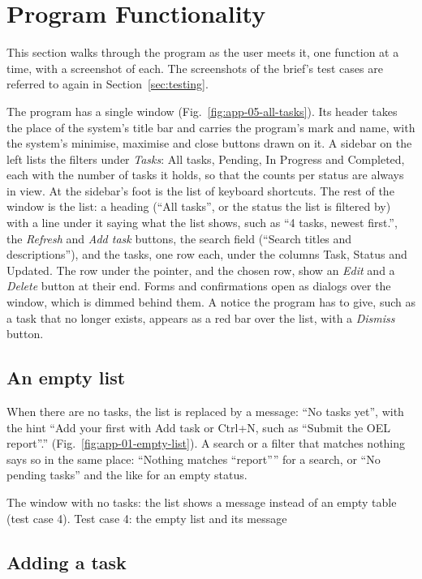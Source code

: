 \section{Program Functionality}\label{sec:functionality}

This section walks through the program as the user meets it, one function at a time, with a screenshot of each. The
screenshots of the brief's test cases are referred to again in Section~\ref{sec:testing}.

The program has a single window (Fig.~\ref{fig:app-05-all-tasks}). Its header takes the place of the system's title
bar and carries the program's mark and name, with the system's minimise, maximise and close buttons drawn on it. A
sidebar on the left lists the filters under \emph{Tasks}: All tasks, Pending, In Progress and Completed, each with the
number of tasks it holds, so that the counts per status are always in view. At the sidebar's foot is the list of
keyboard shortcuts. The rest of the window is the list: a heading (``All tasks'', or the status the list is filtered
by) with a line under it saying what the list shows, such as ``4 tasks, newest first.'', the \emph{Refresh} and
\emph{Add task} buttons, the search field (``Search titles and descriptions''), and the tasks, one row each, under the
columns Task, Status and Updated. The row under the pointer, and the chosen row, show an \emph{Edit} and a
\emph{Delete} button at their end. Forms and confirmations open as dialogs over the window, which is dimmed behind
them. A notice the program has to give, such as a task that no longer exists, appears as a red bar over the list,
with a \emph{Dismiss} button.

\subsection{An empty list}

When there are no tasks, the list is replaced by a message: ``No tasks yet'', with the hint ``Add your first with Add
task or Ctrl+N, such as “Submit the OEL report”.'' (Fig.~\ref{fig:app-01-empty-list}). A search or a filter that
matches nothing says so in the same place: ``Nothing matches “report”'' for a search, or ``No pending tasks'' and the
like for an empty status.

  {The window with no tasks: the list shows a message instead of an empty table (test case 4).}
  {Test case 4: the empty list and its message}

\subsection{Adding a task}

